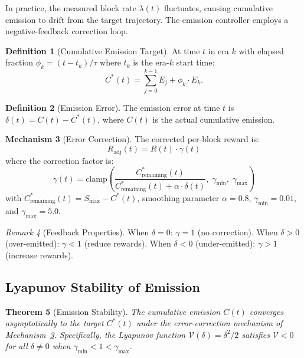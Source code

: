 \documentclass[11pt,a4paper]{article}
\newtheorem{theorem}{Theorem}[section]
\theoremstyle{definition}
\newtheorem{definition}[theorem]{Definition}
\newtheorem{mechanism}[theorem]{Mechanism}
\theoremstyle{remark}
\newtheorem{remark}[theorem]{Remark}
\newcommand{\reward}{R}
\newcommand{\blockrate}{\lambda}
\newcommand{\Lyap}{\mathcal{V}}
\begin{document}
In practice, the measured block rate $\blockrate(t)$ fluctuates, causing
cumulative emission to drift from the target trajectory.
The emission controller employs a negative-feedback correction loop.

\begin{definition}[Cumulative Emission Target]\label{def:cumulative-target}
At time $t$ in era $k$ with elapsed fraction $\phi_k = (t - t_k) / \tau$
where $t_k$ is the era-$k$ start time:
\[
  C^*(t) = \sum_{j=0}^{k-1} E_j + \phi_k \cdot E_k.
\]
\end{definition}

\begin{definition}[Emission Error]\label{def:emission-error}
The emission error at time $t$ is $\delta(t) = C(t) - C^*(t)$,
where $C(t)$ is the actual cumulative emission.
\end{definition}

\begin{mechanism}[Error Correction]\label{mech:correction}
The corrected per-block reward is:
\begin{equation}\label{eq:correction}
  \reward_{\text{adj}}(t) = \reward(t) \cdot \gamma(t)
\end{equation}
where the correction factor is:
\begin{equation}\label{eq:correction-factor}
  \gamma(t) = \text{clamp}\!\left(
    \frac{C^*_{\text{remaining}}(t)}{C^*_{\text{remaining}}(t) + \alpha \cdot \delta(t)},
    \; \gamma_{\min}, \; \gamma_{\max}
  \right)
\end{equation}
with $C^*_{\text{remaining}}(t) = S_{\max} - C^*(t)$,
smoothing parameter $\alpha = 0.8$,
$\gamma_{\min} = 0.01$, and $\gamma_{\max} = 5.0$.
\end{mechanism}

\begin{remark}[Feedback Properties]\label{rem:feedback}
When $\delta = 0$: $\gamma = 1$ (no correction).
When $\delta > 0$ (over-emitted): $\gamma < 1$ (reduce rewards).
When $\delta < 0$ (under-emitted): $\gamma > 1$ (increase rewards).
\end{remark}

\subsection{Lyapunov Stability of Emission}

\begin{theorem}[Emission Stability]\label{thm:lyapunov}
The cumulative emission $C(t)$ converges asymptotically to the target
$C^*(t)$ under the error-correction mechanism of
Mechanism~\ref{mech:correction}.
Specifically, the Lyapunov function
$\Lyap(\delta) = \delta^2 / 2$ satisfies
$\dot{\Lyap} < 0$ for all $\delta \neq 0$ when $\gamma_{\min} < 1 < \gamma_{\max}$.
\end{theorem}
\end{document}
